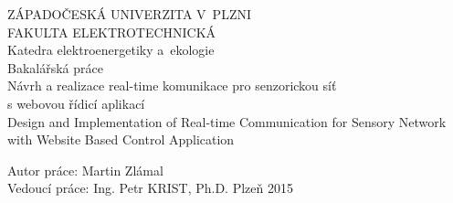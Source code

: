 \documentclass[oneside,12pt,a4paper,final]{book} %
\begin{document}
\pagestyle{empty}
\begin{titlepage}
\noindent
\begin{center}
	{\LARGE ZÁPADOČESKÁ UNIVERZITA V~PLZNI} \\[0.1cm]
	{\LARGE FAKULTA ELEKTROTECHNICKÁ} \\[0.4cm]
	{\Large\sc Katedra elektroenergetiky a~ekologie} \\
	\vspace{5cm}
	{\Huge\sc Bakalářská práce} \\
	\vspace{1cm}
	{\large Návrh a realizace real-time komunikace pro senzorickou síť\\s webovou řídicí aplikací\\}
	\vspace{1cm}
	{\large Design and Implementation of Real-time Communication for Sensory Network with Website Based Control Application}
\end{center}
\vfill
Autor práce: Martin Zlámal\\
Vedoucí práce: Ing. Petr KRIST, Ph.D. \hfill Plzeň 2015
\end{titlepage}

\pagestyle{plain}
%
%





\tableofcontents
\cleardoublepage
{}
{}
\listoffigures
\end{document}
